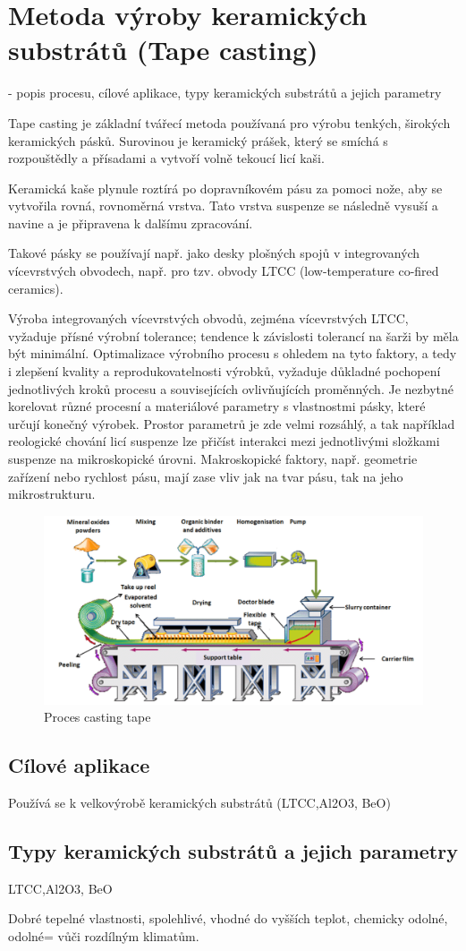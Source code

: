 \section{Metoda výroby keramických substrátů (Tape casting)}
- popis procesu, cílové aplikace, typy keramických substrátů a jejich parametry

Tape casting je základní tvářecí metoda používaná pro výrobu tenkých, širokých keramických pásků. Surovinou je keramický prášek, který se smíchá s rozpouštědly a přísadami a vytvoří volně tekoucí licí kaši.

Keramická kaše plynule roztírá po dopravníkovém pásu za pomoci nože, aby se vytvořila rovná, rovnoměrná vrstva. Tato vrstva suspenze se následně vysuší a navine a je připravena k dalšímu zpracování.

Takové pásky se používají např. jako desky plošných spojů v integrovaných vícevrstvých obvodech, např. pro tzv. obvody LTCC (low-temperature co-fired ceramics). 

Výroba integrovaných vícevrstvých obvodů, zejména vícevrstvých LTCC, vyžaduje přísné výrobní tolerance; tendence k závislosti tolerancí na šarži by měla být minimální. Optimalizace výrobního procesu s ohledem na tyto faktory, a tedy i zlepšení kvality a reprodukovatelnosti výrobků, vyžaduje důkladné pochopení jednotlivých kroků procesu a souvisejících ovlivňujících proměnných. Je nezbytné korelovat různé procesní a materiálové parametry s vlastnostmi pásky, které určují konečný výrobek. Prostor parametrů je zde velmi rozsáhlý, a tak například reologické chování licí suspenze lze přičíst interakci mezi jednotlivými složkami suspenze na mikroskopické úrovni. Makroskopické faktory, např. geometrie zařízení nebo rychlost pásu, mají zase vliv jak na tvar pásu, tak na jeho mikrostrukturu.  
\begin{figure}[h]
   \begin{center}
     \includegraphics[scale=0.3]{images/Casting.png}
   \end{center}
   \caption{Proces casting tape}
\end{figure}

\subsection{Cílové aplikace}
Používá se k velkovýrobě keramických substrátů (LTCC,Al2O3, BeO)
\subsection{Typy keramických substrátů a jejich parametry}
LTCC,Al2O3, BeO

Dobré tepelné vlastnosti, spolehlivé, vhodné do vyšších teplot, chemicky odolné, odolné= vůči rozdílným klimatům.